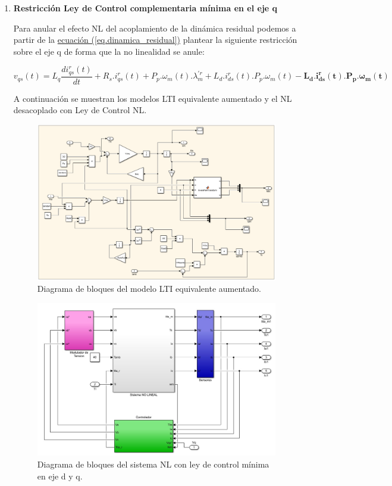 \documentclass{article}
\begin{document}
\begin{enumerate}[label=\roman*.]
    \item \textbf{Restricción Ley de Control complementaria mínima en el eje q}
    
    Para anular el efecto NL del acoplamiento de la dinámica residual podemos a partir de la
    \hyperref[eq.dinamica_residual]{ecuación (\ref*{eq.dinamica_residual})}
    plantear la siguiente restricción sobre el eje q de forma que la no linealidad se anule:

    \begin{equation}
        v_{qs}(t) = L_{q}\frac{di_{qs}^r(t)}{dt} + R_{s}.i_{qs}^r(t) + P_{p}.\omega_{m}(t).\lambda_{m}^{\prime r} + L_{d}.i_{ds}^r(t).P_{p}.\omega_{m}(t) - \mathbf{L_{d}.i_{ds}^r(t).P_{p}.\omega_{m}(t)}
    \end{equation}


    A continuación se muestran los modelos LTI equivalente aumentado y el NL desacoplado con Ley de Control NL.

    \begin{figure}[H]
        \centering
        \includegraphics[width=1\textwidth]{LTI_aumentado1.png}
        \caption{Diagrama de bloques del modelo LTI equivalente aumentado.}
    \end{figure}

    \begin{figure}[H]
        \centering
        \includegraphics[width=1\textwidth]{LTI_AUMENTADO_Q.jpg}
        \caption{Diagrama de bloques del sistema NL con ley de control mínima en eje d y q.}
    \end{figure}


\end{enumerate}
\end{document}
